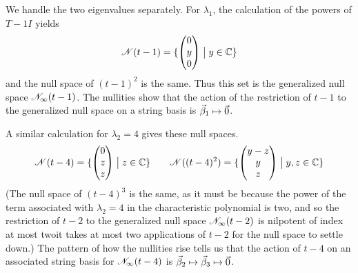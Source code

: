 \begin{exercises}
\begin{answer}
\begin{exparts}
            We handle the two eigenvalues separately.
            For $\lambda_1$, the calculation of the powers of $T-1I$
            yields
            \begin{equation*}
              \mathscr{N}(t-1)=\mbox{$\{\begin{pmatrix} 0 \\ y \\ 0 \end{pmatrix}
                                      \bigm| y\in\mathbb{C}\}$}
            \end{equation*}
            and the null space of $(t-1)^2$ is the same.
            Thus this set is the generalized null space 
            $\mathscr{N}_\infty(t-1)$.
            The nullities show that the action of the restriction of $t-1$ 
            to the generalized null space on a string basis
            is  $\vec{\beta}_1\mapsto\vec{0}$.

            A similar calculation for $\lambda_2=4$ gives these null spaces.
            \begin{equation*}
              \mathscr{N}(t-4)=\mbox{$\{\begin{pmatrix} 0 \\ z \\ z \end{pmatrix}
                                      \bigm| z\in\mathbb{C}\}$}
              \qquad
              \mathscr{N}((t-4)^2)=\mbox{$\{\begin{pmatrix} y-z \\ y \\ z \end{pmatrix}
                                          \bigm| y,z\in\mathbb{C}\}$}
            \end{equation*}
            (The null space of $(t-4)^3$ is the same, as it must be because
            the power of the term associated with $\lambda_2=4$ in the
            characteristic polynomial is two, and so the restriction of
            $t-2$ to the generalized null space $\mathscr{N}_\infty(t-2)$
            is nilpotent of index at most two\Dash it takes at most
            two applications of $t-2$ for the null space to settle down.)
            The pattern of how the nullities rise tells us that
             the action of $t-4$ on an associated string basis 
            for $\mathscr{N}_\infty(t-4)$ is 
            $\vec{\beta}_2\mapsto\vec{\beta}_3\mapsto\vec{0}$.


\end{exparts}
\end{answer}
\end{exercises}
